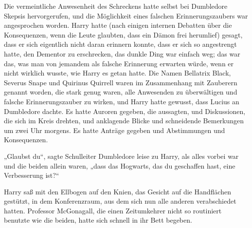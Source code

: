 Die vermeintliche Anwesenheit des Schreckens hatte selbst bei Dumbledore Skepsis hervorgerufen, und die Möglichkeit eines falschen Erinnerungszaubers war angesprochen worden.
Harry hatte (nach einigen internen Debatten über die Konsequenzen, wenn die Leute glaubten, dass ein Dämon frei herumlief) gesagt, dass er sich eigentlich nicht daran erinnern konnte, dass er sich so angestrengt hatte, den Dementor zu erschrecken, das dunkle Ding war einfach weg; das war das, was man von jemandem als falsche Erinnerung erwarten würde, wenn er nicht wirklich wusste, wie Harry es getan hatte.
Die Namen Bellatrix Black, Severus Snape und Quirinus Quirrell waren im Zusammenhang mit Zauberern genannt worden, die stark genug waren, alle Anwesenden zu überwältigen und falsche Erinnerungszauber zu wirken, und Harry hatte gewusst, dass Lucius an Dumbledore dachte. Es hatte Auroren gegeben, die aussagten, und Diskussionen, die sich im Kreis drehten, und anklagende Blicke und schneidende Bemerkungen um zwei Uhr morgens. Es hatte Anträge gegeben und Abstimmungen und Konsequenzen.

„Glaubst du“, sagte Schulleiter Dumbledore leise zu Harry, als alles vorbei war und die beiden allein waren, „dass das Hogwarts, das du geschaffen hast, eine Verbesserung ist?“

Harry saß mit den Ellbogen auf den Knien, das Gesicht auf die Handflächen gestützt, in dem Konferenzraum, aus dem sich nun alle anderen verabschiedet hatten.
Professor McGonagall, die einen Zeitumkehrer nicht so routiniert benutzte wie die beiden, hatte sich schnell in ihr Bett begeben.

